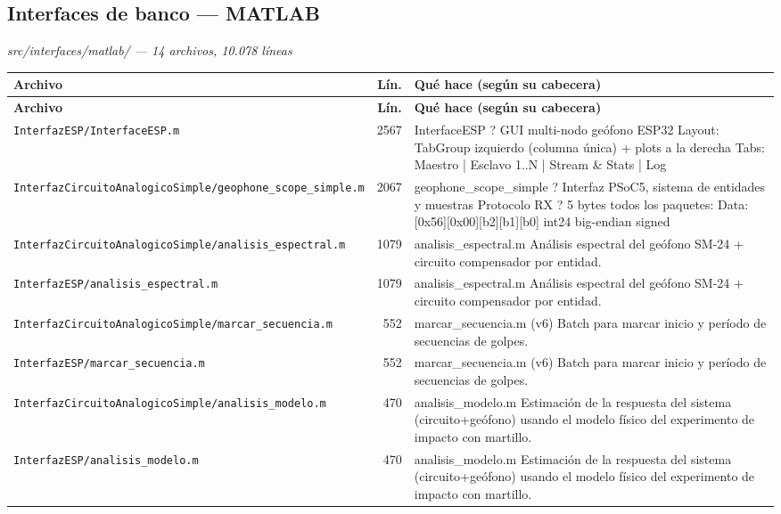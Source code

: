 \subsection{Interfaces de banco --- MATLAB}
\textit{\small src/interfaces/matlab/ --- 14 archivos, 10.078 l\'ineas}
\footnotesize
\begin{longtable}{@{}p{5.4cm} r p{8.6cm}@{}}
\toprule \textbf{Archivo} & \textbf{L\'in.} & \textbf{Qu\'e hace (seg\'un su cabecera)} \\ \midrule
\endfirsthead
\toprule \textbf{Archivo} & \textbf{L\'in.} & \textbf{Qu\'e hace (seg\'un su cabecera)} \\ \midrule
\endhead
\bottomrule \endfoot
\texttt{\scriptsize InterfazESP/InterfaceESP.m} & 2567 & InterfaceESP ? GUI multi-nodo geófono ESP32 Layout: TabGroup izquierdo (columna única) + plots a la derecha Tabs: Maestro | Esclavo 1..N | Stream \& Stats | Log \\
\texttt{\scriptsize InterfazCircuitoAnalogicoSimple/geophone\_scope\_simple.m} & 2067 & geophone\_scope\_simple ? Interfaz PSoC5, sistema de entidades y muestras Protocolo RX ? 5 bytes todos los paquetes: Data:     [0x56][0x00][b2][b1][b0]  int24 big-endian signed \\
\texttt{\scriptsize InterfazCircuitoAnalogicoSimple/analisis\_espectral.m} & 1079 & analisis\_espectral.m Análisis espectral del geófono SM-24 + circuito compensador por entidad. \\
\texttt{\scriptsize InterfazESP/analisis\_espectral.m} & 1079 & analisis\_espectral.m Análisis espectral del geófono SM-24 + circuito compensador por entidad. \\
\texttt{\scriptsize InterfazCircuitoAnalogicoSimple/marcar\_secuencia.m} & 552 & marcar\_secuencia.m  (v6) Batch para marcar inicio y período de secuencias de golpes. \\
\texttt{\scriptsize InterfazESP/marcar\_secuencia.m} & 552 & marcar\_secuencia.m  (v6) Batch para marcar inicio y período de secuencias de golpes. \\
\texttt{\scriptsize InterfazCircuitoAnalogicoSimple/analisis\_modelo.m} & 470 & analisis\_modelo.m Estimación de la respuesta del sistema (circuito+geófono) usando el modelo físico del experimento de impacto con martillo. \\
\texttt{\scriptsize InterfazESP/analisis\_modelo.m} & 470 & analisis\_modelo.m Estimación de la respuesta del sistema (circuito+geófono) usando el modelo físico del experimento de impacto con martillo. \\

\end{longtable}
